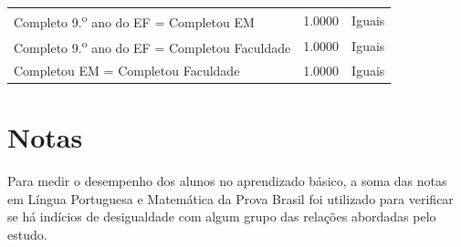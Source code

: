 \begin{table}[htb]
\begin{tabular}{lcc}
    Completo 9.\textsuperscript{o} ano do EF = Completou EM & 1.0000 & Iguais\\
    Completo 9.\textsuperscript{o} ano do EF = Completou Faculdade & 1.0000 & Iguais\\
    
    Completou EM = Completou Faculdade & 1.0000 & Iguais\\
    \bottomrule
    \end{tabular}
    \centering
\end{table}

\newpage
\section{Notas}

Para medir o desempenho dos alunos no aprendizado básico, a soma das notas em Língua Portuguesa e Matemática da
Prova Brasil foi utilizado para verificar se há indícios de desigualdade com algum grupo das
relações abordadas pelo estudo.

